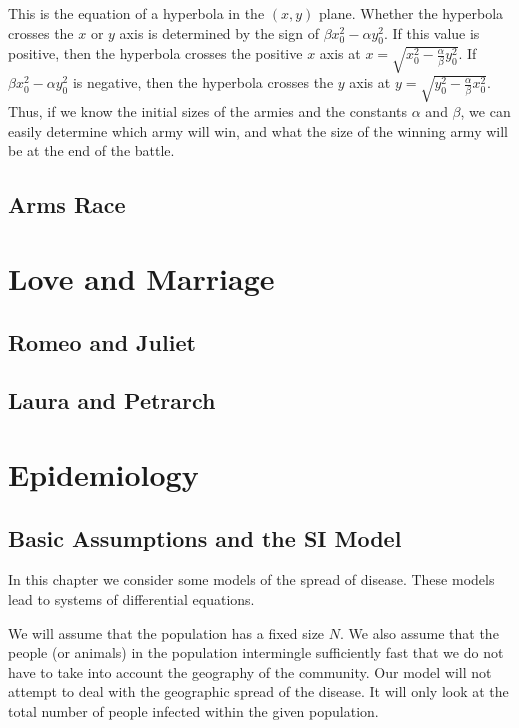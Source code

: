 \documentclass{book}
\begin{document}
This is the equation of a hyperbola in the $(x,y)$ plane.
Whether the hyperbola crosses the $x$ or $y$ axis is
determined by the sign of
$\beta x_0^2 - \alpha y_0^2$.
If this value is positive, then the hyperbola
crosses the positive $x$ axis
at $x=\sqrt{x_0^2 - \frac{\alpha}{\beta} y_0^2}$.
If $\beta x_0^2 - \alpha y_0^2$
is negative, then the hyperbola
crosses the $y$ axis at
$y = \sqrt{y_0^2 - \frac{\alpha}{\beta} x_0^2}$.
Thus, if we know the initial sizes of the armies
and the constants $\alpha$ and $\beta$, we can
easily determine which army will win, and what the
size of the winning army will be at the end of the
battle.
\subsection{Arms Race}
%
\section{Love and Marriage}
\subsection{Romeo and Juliet}
\subsection{Laura and Petrarch}
%
\section{Epidemiology}
\subsection{Basic Assumptions and the SI Model}

In this chapter we consider some models of the spread of disease.
These models lead to systems of differential equations.

We will assume that the population has a fixed size $N$.
We also assume that the people (or animals) in the population
intermingle sufficiently fast that we do not have to take
into account the geography of the community.
Our model will not attempt to deal with the geographic spread
of the disease. It will only look at the total number of
people infected within the given population.
\end{document}
